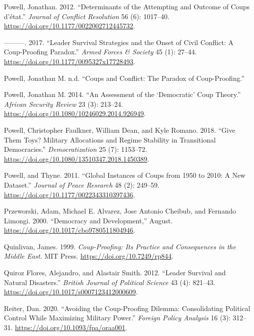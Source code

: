 \documentclass[
  12pt,
]{report}
\newlength{\cslhangindent}
\newenvironment{CSLReferences}[2] %
 {\begin{list}{}{%
  \setlength{\itemindent}{0pt}
  \setlength{\leftmargin}{0pt}
  \setlength{\parsep}{0pt}
  \ifodd #1
   \setlength{\leftmargin}{\cslhangindent}
   \setlength{\itemindent}{-1\cslhangindent}
  \fi
  \setlength{\itemsep}{#2\baselineskip}}}
 {\end{list}}
\begin{document}
\begin{CSLReferences}{1}{0}
Powell, Jonathan. 2012. {``Determinants of the Attempting and Outcome of
Coups d{'}état.''} \emph{Journal of Conflict Resolution} 56 (6):
1017--40. \url{https://doi.org/10.1177/0022002712445732}.

---------. 2017. {``Leader Survival Strategies and the Onset of Civil
Conflict: A Coup-Proofing Paradox.''} \emph{Armed Forces \& Society} 45
(1): 27--44. \url{https://doi.org/10.1177/0095327x17728493}.

Powell, Jonathan M. n.d. {``Coups and Conflict: The Paradox of
Coup-Proofing.''}

Powell, Jonathan M. 2014. {``An Assessment of the {`}Democratic{'} Coup
Theory.''} \emph{African Security Review} 23 (3): 213--24.
\url{https://doi.org/10.1080/10246029.2014.926949}.

Powell, Christopher Faulkner, William Dean, and Kyle Romano. 2018.
{``Give Them Toys? Military Allocations and Regime Stability in
Transitional Democracies.''} \emph{Democratization} 25 (7): 1153--72.
\url{https://doi.org/10.1080/13510347.2018.1450389}.

Powell, and Thyne. 2011. {``Global Instances of Coups from 1950 to 2010:
A New Dataset.''} \emph{Journal of Peace Research} 48 (2): 249--59.
\url{https://doi.org/10.1177/0022343310397436}.

Przeworski, Adam, Michael E. Alvarez, Jose Antonio Cheibub, and Fernando
Limongi. 2000. {``Democracy and Development,''} August.
\url{https://doi.org/10.1017/cbo9780511804946}.

Quinlivan, James. 1999. \emph{Coup-Proofing: Its Practice and
Consequences in the Middle East}. MIT Press.
\url{https://doi.org/10.7249/rp844}.

Quiroz Flores, Alejandro, and Alastair Smith. 2012. {``Leader Survival
and Natural Disasters.''} \emph{British Journal of Political Science} 43
(4): 821--43. \url{https://doi.org/10.1017/s0007123412000609}.

Reiter, Dan. 2020. {``Avoiding the Coup-Proofing Dilemma: Consolidating
Political Control While Maximizing Military Power.''} \emph{Foreign
Policy Analysis} 16 (3): 312--31.
\url{https://doi.org/10.1093/fpa/oraa001}.


\end{CSLReferences}
\end{document}
